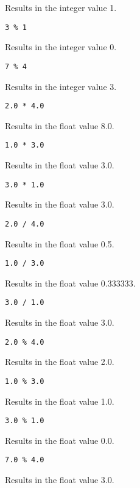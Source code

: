 {\begin{itemize}
{			Results in the integer value 1.
		
		\item[] \lstinline[language=MAIA, columns=fixed]@3 % 1@
		
			Results in the integer value 0.
		
		\item[] \lstinline[language=MAIA, columns=fixed]@7 % 4@
		
			Results in the integer value 3.
		
		\item[] \lstinline[language=MAIA, columns=fixed]@2.0 * 4.0@
		
			Results in the float value 8.0.
		
		\item[] \lstinline[language=MAIA, columns=fixed]@1.0 * 3.0@
		
			Results in the float value 3.0.
		
		\item[] \lstinline[language=MAIA, columns=fixed]@3.0 * 1.0@
		
			Results in the float value 3.0.
			
		\item[] \lstinline[language=MAIA, columns=fixed]@2.0 / 4.0@
		
			Results in the float value 0.5.
		
		\item[] \lstinline[language=MAIA, columns=fixed]@1.0 / 3.0@
		
			Results in the float value 0.333333.
		
		\item[] \lstinline[language=MAIA, columns=fixed]@3.0 / 1.0@
		
			Results in the float value 3.0.
			
		\item[] \lstinline[language=MAIA, columns=fixed]@2.0 % 4.0@
		
			Results in the float value 2.0.
		
		\item[] \lstinline[language=MAIA, columns=fixed]@1.0 % 3.0@
		
			Results in the float value 1.0.
		
		\item[] \lstinline[language=MAIA, columns=fixed]@3.0 % 1.0@
		
			Results in the float value 0.0.
		
		\item[] \lstinline[language=MAIA, columns=fixed]@7.0 % 4.0@
		
			Results in the float value 3.0.
	}
	\end{itemize}
}















